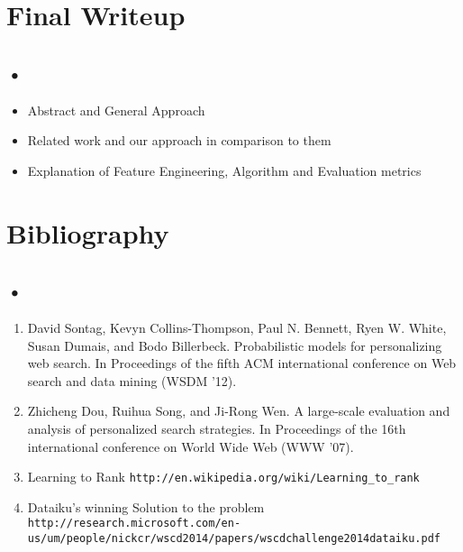 \documentclass[11pt]{article}
\begin{document}
\section{Final Writeup}
\subsection*{•}
\vspace{-5mm}
\begin{itemize}\setlength{\itemsep}{-5pt}
\item Abstract and General Approach
\item Related work and our approach in comparison to them
\item Explanation of Feature Engineering, Algorithm and Evaluation metrics  
\end{itemize}
\noindent
\section{Bibliography}
\subsection*{•}
\vspace{-5mm}
\begin{enumerate}\setlength{\itemsep}{-5pt}
\item David Sontag, Kevyn Collins-Thompson, Paul N. Bennett, Ryen W. White, Susan Dumais, and Bodo Billerbeck. Probabilistic models for personalizing web search. In Proceedings of the fifth ACM international conference on Web search and data mining (WSDM '12).
\item Zhicheng Dou, Ruihua Song, and Ji-Rong Wen.  A large-scale evaluation and analysis of personalized search strategies. In Proceedings of the 16th international conference on World Wide Web (WWW '07).
\item Learning to Rank \texttt{http://en.wikipedia.org/wiki/Learning\_to\_rank}
\item Dataiku's winning Solution to the problem \texttt{http://research.microsoft.com/en-us/um/people/nickcr/wscd2014/papers/wscdchallenge2014dataiku.pdf}

\end{enumerate}
\end{document}
